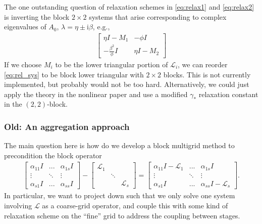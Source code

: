\documentclass[a4paper,10pt]{article}
\begin{document}
The one outstanding question of relaxation schemes in \eqref{eq:relax1} and
\eqref{eq:relax2} is inverting the block $2\times 2$ systems that arise
corresponding to complex eigenvalues of $A_0$, $\lambda = \eta \pm \mathrm{i}\beta$,
e.g.,
%
\begin{align}\label{eq:rel_sys}
\begin{bmatrix} \eta I - M_1 & -\phi I \\ -\frac{\beta^2}{\phi}I & \eta I - M_2 \end{bmatrix}
\end{align}
%
If we choose $M_i$ to be the lower triangular portion of $\mathcal{L}_i$, we
can reorder \eqref{eq:rel_sys} to be block lower triangular with $2\times 2$
blocks. This is not currently implemented, but probably would not be too hard.
Alternatively, we could just apply the theory in the nonlinear paper and use
a modified $\gamma_*$ relaxation constant in the $(2,2)$-block.




\subsubsection{Old: An aggregation approach}\label{sec:mg:mg:agg}

The main question here is how do we develop a block multigrid method to precondition
the block operator
%
\begin{align}\label{eq:k3}
\begin{bmatrix} \alpha_{11} I & ... & \alpha_{1s}I  \\ \vdots & \ddots & \vdots
		\\ \alpha_{s1}I &  ... & \alpha_{ss}I\end{bmatrix}
	- \begin{bmatrix} \mathcal{L}_1 &  \\
	 & \ddots & \\ & & \mathcal{L}_s \end{bmatrix} = 
\begin{bmatrix} \alpha_{11} I - \mathcal{L}_1 & ... & \alpha_{1s}I  \\ \vdots & \ddots & \vdots
		\\ \alpha_{s1}I &  ... & \alpha_{ss}I - \mathcal{L}_s\end{bmatrix}.
\end{align}
%
In particular, we want to project down such that we only solve one system involving
$\mathcal{L}$ as a coarse-grid operator, and couple this with some kind of relaxation
scheme on the ``fine'' grid to address the coupling between stages.
\end{document}
